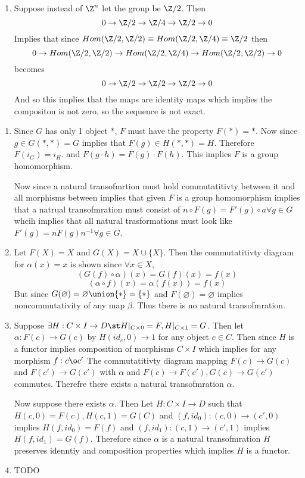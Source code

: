 \documentclass[12pt]{amsart}
\begin{document}
\begin{problem}[Problem 4]
\begin{enumerate}
      \item Suppose instead of $\Z^n$ let the group be $\Z/2$. Then 
      \[0\to \Z/2 \to \Z/4 \to \Z/2\to 0\]
      Implies that since $Hom(\Z/2,\Z/2) \equiv Hom(\Z/2,\Z/4) \equiv \Z/2$ then 
      \[0\to Hom(\Z/2, \Z/2) \to Hom(\Z/2, \Z/4) \to Hom(\Z/2, \Z/2) \to 0\]
      becomes 
      \[0\to \Z/2\to \Z/2 \to \Z/2 \to 0\]
      And so this implies that the maps are identity maps which implies the compositon is not zero, so the sequence is not exact. 
    \end{enumerate}
    
  \end{problem}
  
  \begin{problem}[Problem 5]
  \begin{enumerate}
    \item Since $G$ has only 1 object $*$, $F$ must have the property $F(*)=*$. Now since $g\in G(*,*)=G$ implies that $F(g)\in H(*,*)=H$. Therefore $F(i_G)=i_H$. and $F(g\cdot h)=F(g)\cdot F(h)$. This implies $F$ is a group homomorphism. 

      Now since a natural transofmrtion must hold commutatitivty between it and all morphisms between implies that given $F$ is a group homomorphism implies that a natrual transofmration must consist of $n\circ F(g) = F'(g)\circ a \forall g\in G$ whcih implies that all natural trasformations must look like $F'(g)=n F(g)n^{-1}\forall g\in G$. 

    \item Let $F(X)=X$ and $G(X)=X\cup \{X\}$. Then the commutatitivty diagram for $\alpha(x)=x$ is shown since $\forall x\in X$, 
      \[(G(f)\circ \alpha)(x) = G(f)(x)=f(x)\]
      \[(\alpha \circ f)(x)=\alpha (f(x)) = f(x)\]
      But since $G(\varnothing) = \varnothing \union \{*\} = \{*\}$ and $F(\varnothing)=\varnothing$ implies noncommutativity of any map $\beta$. Thus there is no natural transofmration. 

    \item 
      Suppose $\exists H: C\times I\to D \st H|_{C\times 0} = F, H|_{C\times 1}=G$. Then let $\alpha: F(c)\to G(c)$ by $H(id_c, 0)\to 1$ for any object $c\in C$. Then since $H$ is a functor implies composition of morphisms $C\times I$ which implies for any morphism $f: c\o c'$ The commutatitivty diagram mapping $F(c) \to G(c)$ and $F(c')\to G(c')$ with $\alpha$ and $F(c)\to F(c'), G(c)\to G(c')$ commutes. Therefre there exists a natural transofmration $\alpha$. 

      Now suppose there exists $\alpha$. Then Let $H: C\times I \to D$ such that $H(c,0)=F(c), H(c,1)=G(C)$ and $(f,id_0): (c,0)\to (c',0)$ implies $H(f, id_0)=F(f)$ and $(f,id_1): (c,1)\to (c',1)$ implies $H(f, id_1)=G(f)$. Therefore since $\alpha$ is a natural transofmration $H$ preserves idenntiy and composition properties which implies $H$ is a functor. 

    \item TODO 
  \end{enumerate} 
  \end{problem}
\end{document}

